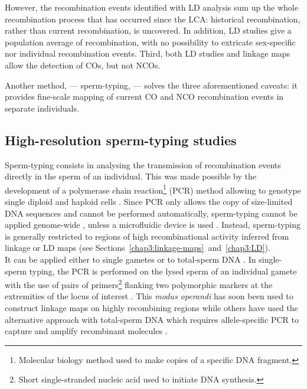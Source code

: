 However, the recombination events identified with LD analysis sum up the whole recombination process that has occurred since the LCA\@: historical recombination, rather than current recombination, is uncovered.
In addition, LD studies give a population average of recombination, with no possibility to extricate sex-specific nor individual recombination events.
Third, both LD studies and linkage maps allow the detection of COs, but not NCOs.

Another method, — sperm-typing, — solves the three aforementioned caveats: it provides fine-scale mapping of current CO and NCO recombination events in separate individuals.



\subsection{High-resolution sperm-typing studies}%

Sperm-typing consists in analysing the transmission of recombination events directly in the sperm of an individual.
This was made possible by the development of a polymerase chain reaction\footnote{Molecular biology method used to make copies of a specific DNA fragment.} (PCR) method allowing to genotype single diploid and haploid cells \citep{li1988amplification}.
Since PCR only allows the copy of size-limited DNA sequences and cannot be performed automatically, sperm-typing cannot be applied genome-wide \citep{coop2008highresolution}, unless a microfluidic device is used \citep{fan2011wholegenome,wang2012genomewide}.
Instead, sperm-typing is generally restricted to regions of high recombinational activity inferred from linkage or LD maps (see Sections~\ref{chap3:linkage-maps}~and~\ref{chap3:LD}).\\

It can be applied either to single gametes or to total-sperm DNA \citep[reviewed in][]{arnheim2003hot}.
In single-sperm typing, the PCR is performed on the lysed sperm of an individual gamete with the use of pairs of primers\footnote{Short single-stranded nucleic acid used to initiate DNA synthesis.} flanking two polymorphic markers at the extremities of the locus of interest \citep{cui1989singlesperm,lien1993simple}.
This \textit{modus operandi} has soon been used to construct linkage maps on highly recombining regions \citep{schmitt1994multipoint,lien2000evidence,cullen2002highresolution} while others \citep{tusie-luna1995gene, jeffreys1998highresolution, jeffreys2001intensely, guillon2002initiation} have used the alternative approach with total-sperm DNA which requires allele-specific PCR to capture and amplify recombinant molecules \citep{wu1989allelespecific}.


